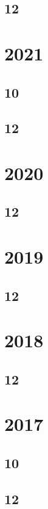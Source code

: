 \documentclass[11pt]{book}
\begin{document}
\subsection{12}

\section{2021}
\subsection{10}

\subsection{12}

\section{2020} 
\subsection{12} 

\section{2019} 
\subsection{12}





\section{2018} 
\subsection{12}



\section{2017}
\subsection{10}

\subsection{12}

\end{document}
